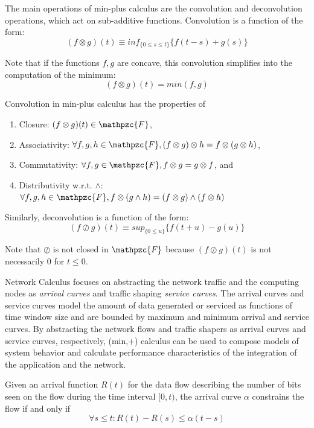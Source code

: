 The main operations of min-plus calculus are the convolution and
deconvolution operations, which act on sub-additive functions.
Convolution is a function of the form:
\begin{equation}
  (f\otimes g)(t)\equiv inf_{\{0\leq s \leq t\}}\{f(t-s)+g(s)\}
\end{equation}

Note that if the functions $f,g$ are concave, this convolution
simplifies into the computation of the minimum:
\begin{equation}
  (f\otimes g)(t)=min(f,g)
\end{equation}

Convolution in min-plus calculus has the properties of 

\begin{enumerate}
\item Closure: $(f\otimes g)(t) \in \mathpzc{F}$,
\item Associativity: $\forall f,g,h \in \mathpzc{F}, (f\otimes
  g)\otimes h = f\otimes(g\otimes h)$,
\item Commutativity: $\forall f,g \in \mathpzc{F}, f\otimes g
  = g\otimes f$, and
\item Distributivity w.r.t. $\wedge$: $\forall f,g,h \in \mathpzc{F},
  f\otimes(g\wedge h) = (f\otimes g)\wedge(f\otimes h)$
\end{enumerate}

Similarly, deconvolution is a function of the form:
\begin{equation} 
  (f\oslash g)(t)\equiv sup_{\{0\leq u\}}\{f(t+u)-g(u)\}
\end{equation}

Note that $\oslash$ is not closed in $\mathpzc{F}$ because $(f\oslash
g)(t)$ is not necessarily $0$ for $t\leq0$.

Network Calculus focuses on abstracting the network traffic and the
computing nodes as \textit{arrival curves} and traffic shaping
\textit{service curves}. The arrival curves and service curves model
the amount of data generated or serviced as functions of time window
size and are bounded by maximum and minimum arrival and service
curves.  By abstracting the network flows and traffic shapers as
arrival curves and service curves, respectively, (min,+) calculus can
be used to compose models of system behavior and calculate performance
characteristics of the integration of the application and the network.

Given an arrival function $R(t)$ for the data flow describing the
number of bits seen on the flow during the time interval $[0,t)$, the
arrival curve $\alpha$ constrains the flow if and only if
\begin{equation}
  \forall s\leq t : R(t) -R(s) \leq \alpha(t-s)
\end{equation}

